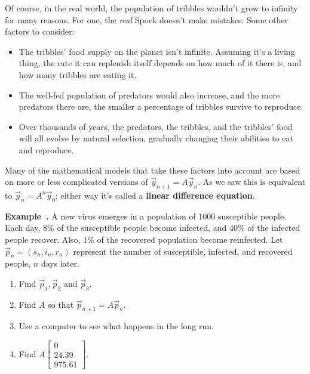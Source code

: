 \documentclass[11pt, letterpaper]{report}
\newenvironment{notes}{}{}
\newcounter{example}[section]
\newcommand{\example}{\refstepcounter{example}%
\par\noindent\textbf{Example~\theexample.} }
\newcommand{\bbbvec}[3]{
  \begin{bmatrix} #1 \\ #2 \\ #3 \end{bmatrix}
}
\begin{document}
Of course, in the real world, the population of tribbles wouldn't grow to infinity for many reasons. For one, the \emph{real} Spock doesn't make mistakes. Some other factors to consider:
\begin{itemize}
\item The tribbles' food supply on the planet isn't infinite. Assuming it's a living thing, the rate it can replenish itself depends on how much of it there is, and how many tribbles are eating it.
\item The well-fed population of predators would also increase, and the more predators there are, the smaller a percentage of tribbles survive to reproduce.
\item Over thousands of years, the predators, the tribbles, and the tribbles' food will all evolve by natural selection, gradually changing their abilities to eat and reproduce.
\end{itemize}
Many of the mathematical models that take these factors into account are based on more or less complicated versions of $\vec{y}_{n+1}=A\vec{y}_n$. As we saw this is equivalent to $\vec{y}_n=A^n\vec{y}_{0}$; either way it's called a \textbf{linear difference equation}. 

\begin{notes}
\newpage
\end{notes}

\example A new virus emerges in a population of 1000 susceptible people. Each day, 8\% of the susceptible people become infected, and 40\% of the infected people recover. Also, 1\% of the recovered population become reinfected. Let $\vec{p}_n = (s_n, i_n, r_n)$ represent the number of susceptible, infected, and recovered people, $n$ days later.
\begin{enumerate}[label=(\alph*)]
  \item Find $\vec{p}_1, \vec{p}_2$ and $\vec{p}_3$.
  \item Find $A$ so that $\vec{p}_{n+1}=A\vec{p}_n$.
  \item Use a computer to see what happens in the long run.
  \item Find $A \bbbvec{0}{24.39}{975.61}.$
\end{enumerate}

\begin{notes}
\vfill
\vfill
\end{notes}
\end{document}
